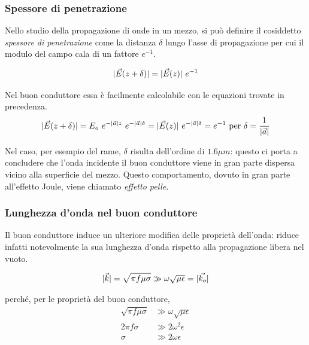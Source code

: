 		\subsubsection{Spessore di penetrazione}
		Nello studio della propagazione di onde in un mezzo, si può definire il cosiddetto \emph{spessore di penetrazione} come la distanza $\delta$ lungo l'asse di propagazione per cui il modulo del campo cala di un fattore $e^{-1}$.

		\begin{equation*}
			|\vec{E}(z + \delta)| = |\vec{E}(z)| ~ e^{-1}
		\end{equation*}

		Nel buon conduttore essa è facilmente calcolabile con le equazioni trovate in precedenza.
		\begin{equation} \begin{split} \label{eq:spessore_penetrazione}
			|\vec{E}(z + \delta)| = E_o ~ e^{-|\vec{a}| z} ~ e^{-|\vec{a}| \delta} = |\vec{E}(z)| ~ e^{-|\vec{a}| \delta} = e^{-1} \text{ per } \delta = \frac{1}{|\vec{a}|}
		\end{split} \end{equation}

		Nel caso, per esempio del rame, $\delta$ risulta dell'ordine di $1.6 \mu m$: questo ci porta a concludere che l'onda incidente il buon conduttore viene in gran parte dispersa vicino alla superficie del mezzo.
		Questo comportamento, dovuto in gran parte all'effetto Joule, viene chiamato \emph{effetto pelle}.

		\subsubsection{Lunghezza d'onda nel buon conduttore}
		Il buon conduttore induce un ulteriore modifica delle proprietà dell'onda: riduce infatti notevolmente la sua lunghezza d'onda rispetto alla propagazione libera nel vuoto.

		\begin{equation*} \begin{split}
			& |\vec{k}|
				= \sqrt{\pi f \mu \sigma}
				\gg \omega \sqrt{\mu \epsilon}
				= |\vec{k_o}| \\
		\end{split} \end{equation*}

		perché, per le proprietà del buon conduttore,
		\begin{equation*} \begin{split}
				\sqrt{\pi f \mu \sigma} &\gg \omega \sqrt{\mu \epsilon} \\
				2 \pi f \sigma &\gg 2 \omega^2 \epsilon \\
				\sigma &\gg 2 \omega \epsilon
		\end{split} \end{equation*}

